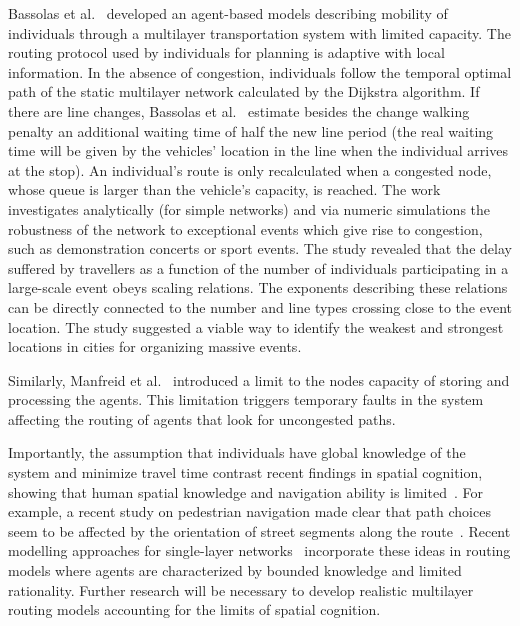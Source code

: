 Bassolas et al.~\cite{bassolas2020scaling} developed an agent-based models describing mobility of individuals through a multilayer transportation system with limited capacity. The routing protocol used by individuals for planning is adaptive with local information. In the absence of congestion, individuals follow the temporal optimal path of the static multilayer network calculated by the Dijkstra algorithm. If there are line changes, Bassolas et al.~\cite{bassolas2020scaling} estimate besides the change walking penalty an additional waiting time of half the new line period (the real waiting time will be given by the vehicles' location in the line when the individual arrives at the stop). An individual's route is only recalculated when a congested node, whose queue is larger than the vehicle’s capacity, is reached. The work investigates analytically (for simple networks) and via numeric simulations the robustness of the network to exceptional events which give rise to congestion, such as demonstration concerts or sport events. The study revealed that the delay suffered by travellers as a function of the number of individuals participating in a large-scale event obeys scaling relations. The exponents describing these relations can be directly connected to the number and line types crossing close to the event location. The study suggested a viable way to identify the weakest and strongest locations in cities for organizing massive events.

Similarly, Manfreid et al.~\cite{manfredi2018congestion} introduced a limit to the nodes capacity of storing and processing the agents. This limitation triggers temporary faults in the system affecting the routing of agents that look for uncongested paths.

Importantly, the assumption that individuals have global knowledge of the system and minimize travel time contrast recent findings in spatial cognition, showing that human spatial knowledge and navigation ability is limited~\cite{gallotti2016limits,bongiorno2021vector}. For example, a recent study on pedestrian navigation made clear that path choices seem to be affected by the orientation of street segments along the route~\cite{bongiorno2021vector}. Recent modelling approaches for single-layer networks~\cite{manley2018exploring} incorporate these ideas in routing models where agents are characterized by bounded knowledge and limited rationality. Further research will be necessary to develop realistic multilayer routing models accounting for the limits of spatial cognition.


